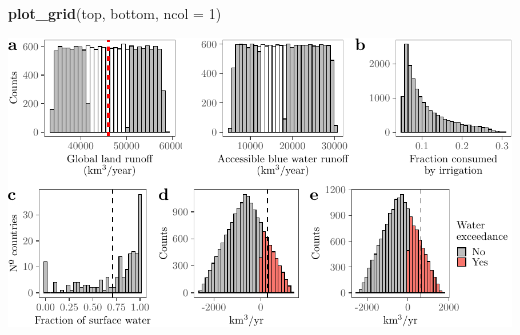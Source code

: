 \documentclass[
  11pt,
]{article}
\newenvironment{Shaded}{\begin{snugshade}}{\end{snugshade}}
\newcommand{\AttributeTok}[1]{\textcolor[rgb]{0.13,0.29,0.53}{#1}}
\newcommand{\DecValTok}[1]{\textcolor[rgb]{0.00,0.00,0.81}{#1}}
\newcommand{\FunctionTok}[1]{\textcolor[rgb]{0.13,0.29,0.53}{\textbf{#1}}}
\newcommand{\NormalTok}[1]{#1}
\begin{document}
\begin{Shaded}
\begin{Highlighting}[]
\FunctionTok{plot\_grid}\NormalTok{(top, bottom, }\AttributeTok{ncol =} \DecValTok{1}\NormalTok{)}
\end{Highlighting}
\end{Shaded}

\includegraphics{code_fallacies_water_crisis_files/figure-latex/merge_plots-1.pdf}

\newpage
\end{document}
